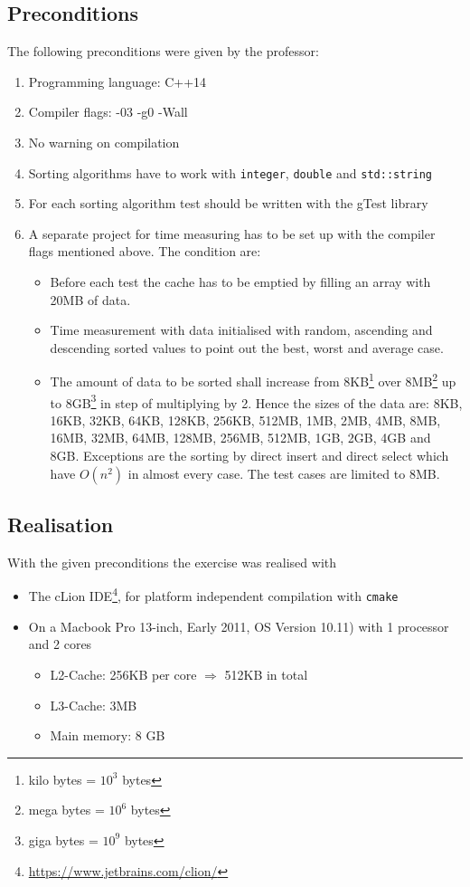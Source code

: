 \documentclass[11pt]{amsart}
\begin{document}
\subsection{Preconditions}
The following preconditions were given by the professor:
\begin{enumerate}
	\item Programming language: C++14
	\item Compiler flags: -03 -g0 -Wall
	\item No warning on compilation
	\item Sorting algorithms have to work with \texttt{integer}, \texttt{double} and \texttt{std::string}
	\item For each sorting algorithm test should be written with the gTest library
	\item A separate project for time measuring has to be set up with the compiler flags mentioned above. The condition are:
	\begin{itemize}
		\item Before each test the cache has to be emptied by filling an array with 20MB of data.
		\item Time measurement with data initialised with random, ascending and descending sorted values to point out the best, worst and average case.
		\item The amount of data to be sorted shall increase from 8KB\footnote{kilo bytes = $10^3$ bytes} over 8MB\footnote{mega bytes = $10^6$ bytes} up to 8GB\footnote{giga bytes = $10^9$ bytes} in step of multiplying by 2. Hence the sizes of the data are: 8KB, 16KB, 32KB, 64KB, 128KB, 256KB, 512MB, 1MB, 2MB, 4MB, 8MB, 16MB, 32MB, 64MB, 128MB, 256MB, 512MB, 1GB, 2GB, 4GB and 8GB. Exceptions are the sorting by direct insert and direct select which have $O(n^2)$ in almost every case. The test cases are limited to 8MB.
	\end{itemize}
\end{enumerate}

\subsection{Realisation}
With the given preconditions the exercise was realised with
\begin{itemize}
	\item The cLion IDE\footnote{\url{https://www.jetbrains.com/clion/}}, for platform independent compilation with \texttt{cmake}
	\item On a Macbook Pro 13-inch, Early 2011, OS Version 10.11) with 1 processor and 2 cores
	\begin{itemize}
		\item L2-Cache: 256KB per core $\Rightarrow$ 512KB in total
		\item L3-Cache: 3MB
		\item Main memory: 8 GB
	\end{itemize}
\end{itemize}
\end{document}
